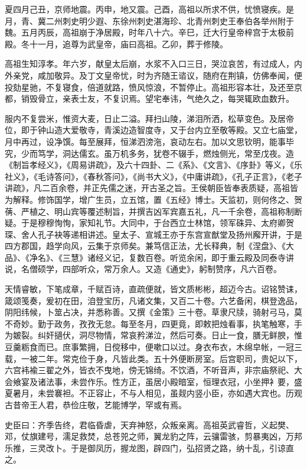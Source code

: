 \documentclass[12pt,UTF8]{ctexbook}
\begin{document}
夏四月己丑，京师地震。丙申，地又震。己酉，高祖以所求不供，忧愤寝疾。是月，青、冀二州刺史明少遐、东徐州刺史湛海珍、北青州刺史王奉伯各举州附于魏。五月丙辰，高祖崩于净居殿，时年八十六。辛巳，迁大行皇帝梓宫于太极前殿。冬十一月，追尊为武皇帝，庙曰高祖。乙卯，葬于修陵。

高祖生知淳孝。年六岁，献皇太后崩，水浆不入口三日，哭泣哀苦，有过成人，内外亲党，咸加敬异。及丁文皇帝忧，时为齐随王谘议，随府在荆镇，仿佛奉闻，便投劾星驰，不复寝食，倍道就路，愤风惊浪，不暂停止。高祖形容本壮，及还至京都，销毁骨立，亲表士友，不复识焉。望宅奉讳，气绝久之，每哭辄欧血数升。

服内不复尝米，惟资大麦，日止二溢。拜扫山陵，涕泪所洒，松草变色。及居帝位，即于钟山造大爱敬寺，青溪边造智度寺，又于台内立至敬等殿。又立七庙堂，月中再过，设净馔。每至展拜，恒涕泗滂沲，哀动左右。加以文思钦明，能事毕究，少而笃学，洞达儒玄。虽万机多务，犹卷不辍手，燃烛侧光，常至戊夜。造《制旨孝经义》，《周易讲疏》，及六十四卦、二《系》、《文言》、《序卦》等义，《乐社义》，《毛诗答问》，《春秋答问》，《尚书大义》，《中庸讲疏》，《孔子正言》，《老子讲疏》，凡二百余卷，并正先儒之迷，开古圣之旨。王侯朝臣皆奉表质疑，高祖皆为解释。修饰国学，增广生员，立五馆，置《五经》博士。天监初，则何佟之、贺蒨、严植之、明山宾等覆述制旨，并撰吉凶军宾嘉五礼，凡一千余卷，高祖称制断疑。于是穆穆恂恂，家知礼节。大同中，于台西立士林馆，领军硃异、太府卿贺琛、舍人孔子袂等递相讲述。皇太子、宣城王亦于东宫宣猷堂及扬州廨开讲，于是四方郡国，趋学向风，云集于京师矣。兼笃信正法，尤长释典，制《涅盘》、《大品》、《净名》、《三慧》诸经义记，复数百卷。听览余闲，即于重云殿及同泰寺讲说，名僧硕学，四部听众，常万余人。又造《通史》，躬制赞序，凡六百卷。

天情睿敏，下笔成章，千赋百诗，直疏便就，皆文质彬彬，超迈今古。诏铭赞诔，箴颂笺奏，爰初在田，洎登宝历，凡诸文集，又百二十卷。六艺备闲，棋登逸品，阴阳纬候，卜筮占决，并悉称善。又撰《金策》三十卷。草隶尺牍，骑射弓马，莫不奇妙。勤于政务，孜孜无怠。每至冬月，四更竟，即敕把烛看事，执笔触寒，手为皴裂。纠奸擿伏，洞尽物情，常哀矜涕泣，然后可奏。日止一食，膳无鲜腴，惟豆羹粝食而已。庶事繁拥，日傥移中，便嗽口以过。身衣布衣，木绵皁帐，一冠三载，一被二年。常克俭于身，凡皆此类。五十外便断房室。后宫职司，贵妃以下，六宫袆褕三翟之外，皆衣不曳地，傍无锦绮。不饮酒，不听音声，非宗庙祭祀、大会飨宴及诸法事，未尝作乐。性方正，虽居小殿暗室，恒理衣冠，小坐押衤要，盛夏暑月，未尝褰袒。不正容止，不与人相见，虽觌内竖小臣，亦如遇大宾也。历观古昔帝王人君，恭俭庄敬，艺能博学，罕或有焉。

史臣曰：齐季告终，君临昏虐，天弃神怒，众叛亲离。高祖英武睿哲，义起樊、邓，仗旗建号，濡足救焚，总苍兕之师，翼龙豹之阵，云骧雷骇，剪暴夷凶，万邦乐推，三灵改卜。于是御凤历，握龙图，辟四门，弘招贤之路，纳十乱，引谅直之。
\end{document}
